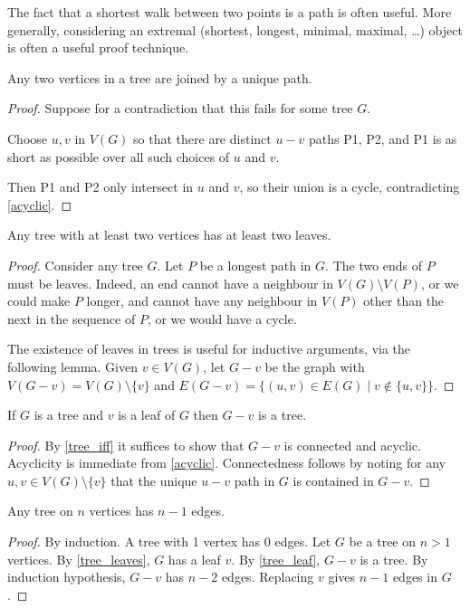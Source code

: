 \begin{remark}
The fact that a shortest walk between two points is a path is often useful. More generally, considering an extremal (shortest, longest, minimal, maximal, \dots) object is often a useful proof technique.
\end{remark}

\begin{lemma}
Any two vertices in a tree are joined by a unique path.
\end{lemma}
\begin{proof}
Suppose for a contradiction that this fails for some tree $G$. 

Choose $u,v$ in $V(G)$ so that there are distinct $u-v$ paths P1, P2, and P1 is as short as possible over all such choices of $u$ and $v$.

Then P1 and P2 only intersect in $u$ and $v$, so their union is a cycle, contradicting \cref{acyclic}.
\end{proof}

\begin{lemma}\label{tree_leaves}
Any tree with at least two vertices has at least two leaves.
\end{lemma}
\begin{proof}
Consider any tree $G$. Let $P$ be a longest path in $G$. The two ends of $P$ must be leaves. Indeed, an end cannot have a neighbour in $V(G) \setminus V(P)$, or we could make $P$ longer, and cannot have any neighbour in $V(P)$ other than the next in the sequence of $P$, or we would have a cycle.

The existence of leaves in trees is useful for inductive arguments, via the following lemma. Given $v \in V(G)$, let $G-v$ be the graph with $V(G-v) = V(G)\setminus\{v\}$ and $E(G-v) = \{(u,v) \in E(G) \mid v \notin \{u,v\}\}$.
\end{proof}

\begin{lemma}\label{tree_leaf}
If $G$ is a tree and $v$ is a leaf of $G$ then $G-v$ is a tree.
\end{lemma}
\begin{proof}
By \cref{tree_iff} it suffices to show that $G-v$ is connected and acyclic. Acyclicity is immediate from \cref{acyclic}. Connectedness follows by noting for any $u,v \in V(G)\setminus\{v\}$ that the unique $u-v$ path in $G$ is contained in $G-v$.
\end{proof}

\begin{lemma}\label{tree_edges}
Any tree on $n$ vertices has $n-1$ edges.
\end{lemma}
\begin{proof}
By induction. A tree with 1 vertex has 0 edges. Let $G$ be a tree on $n>1$ vertices. By \cref{tree_leaves}, $G$ has a leaf $v$. By \cref{tree_leaf}, $G-v$ is a tree. By induction hypothesis, $G-v$ has $n-2$ edges. Replacing $v$ gives $n-1$ edges in $G$.
\end{proof}

